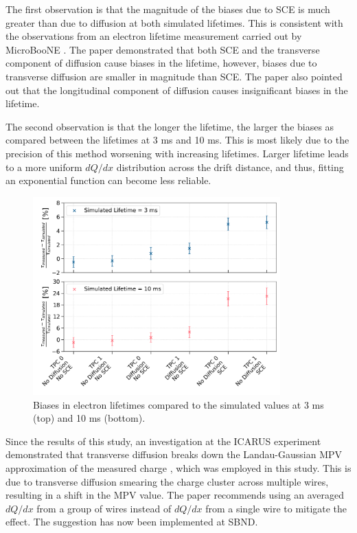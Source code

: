 The first observation is that the magnitude of the biases due to SCE is much greater than due to diffusion at both simulated lifetimes.
This is consistent with the observations from an electron lifetime measurement carried out by MicroBooNE \cite{ubooneEtime}. 
The paper demonstrated that both SCE and the transverse component of diffusion cause biases in the lifetime, however, biases due to transverse diffusion are smaller in magnitude than SCE.
The paper also pointed out that the longitudinal component of diffusion causes insignificant biases in the lifetime.

The second observation is that the longer the lifetime, the larger the biases as compared between the lifetimes at 3 ms and 10 ms.
This is most likely due to the precision of this method worsening with increasing lifetimes.
Larger lifetime leads to a more uniform $dQ/dx$ distribution across the drift distance, and thus, fitting an exponential function can become less reliable.

\begin{figure}[ht!] 
\centering    
\includegraphics[width=0.85\textwidth]{etime_biases_compare}
\caption[Electron Lifetime Measurement Biases]{
Biases in electron lifetimes compared to the simulated values at 3 ms (top) and 10 ms (bottom).
}
\label{fig:etime_biases_compare}
\end{figure}

Since the results of this study, an investigation at the ICARUS experiment demonstrated that transverse diffusion breaks down the Landau-Gaussian MPV approximation of the measured charge \cite{GrayDiffusion}, which was employed in this study.
This is due to transverse diffusion smearing the charge cluster across multiple wires, resulting in a shift in the MPV value. 
The paper recommends using an averaged $dQ/dx$ from a group of wires instead of $dQ/dx$ from a single wire to mitigate the effect.
The suggestion has now been implemented at SBND.

